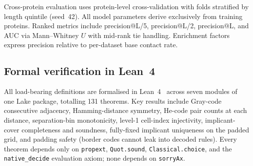 Cross-protein evaluation uses protein-level cross-validation with folds
stratified by length quintile (seed~42).  All model parameters derive
exclusively from training proteins.  Ranked metrics include precision@L/5,
precision@L/2, precision@L, and AUC via Mann--Whitney $U$ with mid-rank tie
handling.  Enrichment factors express precision relative to per-dataset base
contact rate.

\subsection{Formal verification in Lean~4}

All load-bearing definitions are formalised in Lean~4~\cite{lean4} across seven
modules of one Lake package, totalling 131 theorems.  Key results include Gray-code consecutive
adjacency, Hamming-distance symmetry, He-code pair counts at each distance,
separation-bin monotonicity, level-1 cell-index injectivity, implicant-cover
completeness and soundness, fully-fixed implicant uniqueness on the padded
grid, and padding safety (border codes cannot leak into decoded rules).
Every theorem depends only on \texttt{propext}, \texttt{Quot.sound},
\texttt{Classical.choice}, and the \texttt{native\_decide} evaluation axiom;
none depends on \texttt{sorryAx}.
